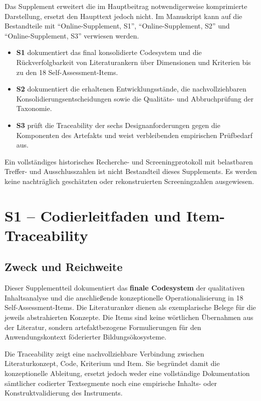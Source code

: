 \documentclass[10pt,a4paper]{article}
\begin{document}
Das Supplement erweitert die im Hauptbeitrag notwendigerweise komprimierte Darstellung, ersetzt den Haupttext jedoch nicht. Im Manuskript kann auf die Bestandteile mit \enquote{Online-Supplement, S1}, \enquote{Online-Supplement, S2} und \enquote{Online-Supplement, S3} verwiesen werden.

\begin{itemize}
  \item \textbf{S1} dokumentiert das final konsolidierte Codesystem und die Rückverfolgbarkeit von Literaturankern über Dimensionen und Kriterien bis zu den 18 Self-Assessment-Items.
  \item \textbf{S2} dokumentiert die erhaltenen Entwicklungsstände, die nachvollziehbaren Konsolidierungsentscheidungen sowie die Qualitäts- und Abbruchprüfung der Taxonomie.
  \item \textbf{S3} prüft die Traceability der sechs Designanforderungen gegen die Komponenten des Artefakts und weist verbleibenden empirischen Prüfbedarf aus.
\end{itemize}

\begin{statusbox}
Ein vollständiges historisches Recherche- und Screeningprotokoll mit belastbaren Treffer- und Ausschlusszahlen ist nicht Bestandteil dieses Supplements. Es werden keine nachträglich geschätzten oder rekonstruierten Screeningzahlen ausgewiesen.
\end{statusbox}

\clearpage
\section{S1 – Codierleitfaden und Item-Traceability}
\label{supp:s1}

\subsection{Zweck und Reichweite}

Dieser Supplementteil dokumentiert das \textbf{finale Codesystem} der qualitativen Inhaltsanalyse und die anschließende konzeptionelle Operationalisierung in 18 Self-Assessment-Items. Die Literaturanker dienen als exemplarische Belege für die jeweils abstrahierten Konzepte. Die Items sind keine wörtlichen Übernahmen aus der Literatur, sondern artefaktbezogene Formulierungen für den Anwendungskontext föderierter Bildungsökosysteme.

Die Traceability zeigt eine nachvollziehbare Verbindung zwischen Literaturkonzept, Code, Kriterium und Item. Sie begründet damit die konzeptionelle Ableitung, ersetzt jedoch weder eine vollständige Dokumentation sämtlicher codierter Textsegmente noch eine empirische Inhalts- oder Konstruktvalidierung des Instruments.
\end{document}
